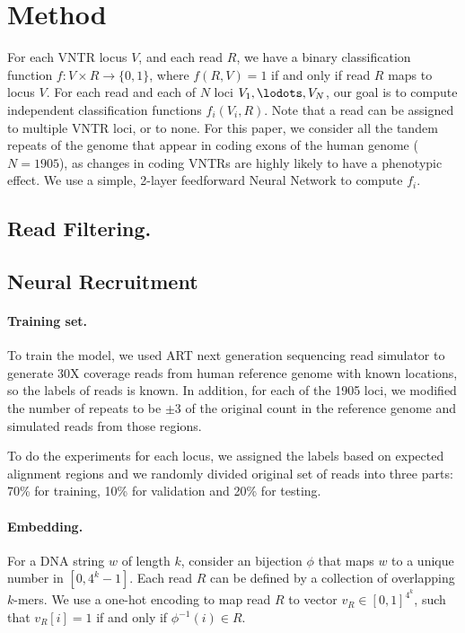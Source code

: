 \section{Method}\label{Method} 
For each VNTR locus $V$, and each read $R$, we have a binary classification function $f:V\times R\rightarrow\{0,1\}$, where $f(R,V)=1$ if and only if read $R$ maps to locus $V$. For each read and each of $N$ loci $V_1,\lodots,V_N$, our goal is to compute independent classification functions $f_i(V_i,R)$. Note that a read can be assigned to multiple VNTR loci, or to none. For this paper, we consider all the tandem repeats of the genome that appear in coding exons of the human genome ($N=1905$), as changes in coding VNTRs are highly likely to have a phenotypic effect. We use a simple, 2-layer feedforward Neural Network to compute $f_i$.

\subsection{Read Filtering.}

\subsection{Neural Recruitment}
\paragraph{Training set.}
To train the model, we used ART next generation sequencing read simulator \cite{Huang2011} to generate 30X coverage reads from human reference genome with known locations, so the labels of reads is known. In addition, for each of the 1905 loci, we modified the number of repeats to be $\pm 3$ of the original count in the reference genome and simulated reads from those regions.

To do the experiments for each locus, we assigned the labels based on expected alignment regions and we randomly divided original set of reads into three parts: 70\% for training, 10\% for validation and 20\% for testing.

\paragraph{Embedding.}
For a DNA string $w$ of length $k$, consider an bijection $\phi$ that maps $w$ to a unique number in $[0,4^k-1]$. Each read $R$ can be defined by a collection of overlapping $k$-mers. We use a one-hot encoding to map read $R$ to vector $v_R\in [0,1]^{4^k}$, such that $v_R[i]=1$ if and only if $\phi^{-1}(i) \in R$.

